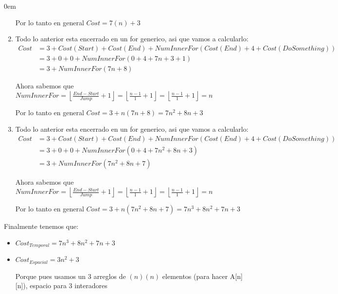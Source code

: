 \documentclass[12pt, fleqn]{article}                            %
\newenvironment{SmallIndentation}[1][0.75em]                    %
        {\begin{adjustwidth}{#1}{}\begin{footnotesize}}             %
        {\end{footnotesize}\end{adjustwidth}}                       %
\theoremstyle{break}                                            %
\newcommand{\Floor}[1]{\left \lfloor #1 \right \rfloor}         %
\begin{document}
\begin{SmallIndentation}[0em]
\begin{enumerate}
                Por lo tanto en general $Cost = 7(n)+3$

            \item Todo lo anterior esta encerrado en un for generico, 
                asi que vamos a calcularlo:
                \begin{align*}
                    Cost 
                        &= 3 + Cost(Start) + Cost(End) + NumInnerFor(Cost(End) + 4 + Cost(DoSomething))     \\
                        &= 3 + 0 + 0 + NumInnerFor(0 + 4 + 7n + 3 + 1)                                      \\
                        &= 3 + NumInnerFor(7n + 8) 
                \end{align*}

                Ahora sabemos que 
                $NumInnerFor 
                    = \Floor{\frac{End - Start}{Jump} + 1}
                    = \Floor{\frac{n - 1}{1} + 1}
                    = \Floor{\frac{n-1}{1} + 1}
                    = n$

                Por lo tanto en general $Cost = 3 + n(7n + 8) = 7n^2 + 8n + 3$

            \item Todo lo anterior esta encerrado en un for generico, 
                asi que vamos a calcularlo:
                \begin{align*}
                    Cost 
                        &= 3 + Cost(Start) + Cost(End) + NumInnerFor(Cost(End) + 4 + Cost(DoSomething))     \\
                        &= 3 + 0 + 0 + NumInnerFor(0 + 4 + 7n^2 + 8n + 3)                                      \\
                        &= 3 + NumInnerFor(7n^2 + 8n + 7) 
                \end{align*}

                Ahora sabemos que 
                $NumInnerFor 
                    = \Floor{\frac{End - Start}{Jump} + 1}
                    = \Floor{\frac{n - 1}{1} + 1}
                    = \Floor{\frac{n-1}{1} + 1}
                    = n$

                Por lo tanto en general $Cost = 3 + n(7n^2 + 8n + 7) = 7n^3 + 8n^2 + 7n + 3$

        \end{enumerate}

        \clearpage

        Finalmente tenemos que:
        \begin{itemize}
            \item $Cost_{Temporal} = 7n^3 + 8n^2 + 7n + 3$
            \item $Cost_{Espacial} = 3n^2 + 3$

                Porque pues usamos un 3 arreglos de $(n)(n)$ elementos (para hacer A[n][n]), 
                espacio para 3 interadores
        \end{itemize}
            
    \end{SmallIndentation}
\end{document}

